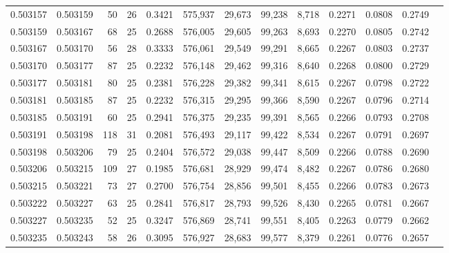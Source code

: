 \begin{tabular}{rrrrrrrrrrrrr}
0.503157 & 0.503159 &  50 &  26 &                                     0.3421 & 575,937 &  29,673 &  99,238 &   8,718 & 0.2271 & 0.0808 & 0.2749 \\
0.503159 & 0.503167 &  68 &  25 &                                     0.2688 & 576,005 &  29,605 &  99,263 &   8,693 & 0.2270 & 0.0805 & 0.2742 \\
0.503167 & 0.503170 &  56 &  28 &                                     0.3333 & 576,061 &  29,549 &  99,291 &   8,665 & 0.2267 & 0.0803 & 0.2737 \\
0.503170 & 0.503177 &  87 &  25 &                                     0.2232 & 576,148 &  29,462 &  99,316 &   8,640 & 0.2268 & 0.0800 & 0.2729 \\
0.503177 & 0.503181 &  80 &  25 &                                     0.2381 & 576,228 &  29,382 &  99,341 &   8,615 & 0.2267 & 0.0798 & 0.2722 \\
0.503181 & 0.503185 &  87 &  25 &                                     0.2232 & 576,315 &  29,295 &  99,366 &   8,590 & 0.2267 & 0.0796 & 0.2714 \\
0.503185 & 0.503191 &  60 &  25 &                                     0.2941 & 576,375 &  29,235 &  99,391 &   8,565 & 0.2266 & 0.0793 & 0.2708 \\
0.503191 & 0.503198 & 118 &  31 &                                     0.2081 & 576,493 &  29,117 &  99,422 &   8,534 & 0.2267 & 0.0791 & 0.2697 \\
0.503198 & 0.503206 &  79 &  25 &                                     0.2404 & 576,572 &  29,038 &  99,447 &   8,509 & 0.2266 & 0.0788 & 0.2690 \\
0.503206 & 0.503215 & 109 &  27 &                                     0.1985 & 576,681 &  28,929 &  99,474 &   8,482 & 0.2267 & 0.0786 & 0.2680 \\
0.503215 & 0.503221 &  73 &  27 &                                     0.2700 & 576,754 &  28,856 &  99,501 &   8,455 & 0.2266 & 0.0783 & 0.2673 \\
0.503222 & 0.503227 &  63 &  25 &                                     0.2841 & 576,817 &  28,793 &  99,526 &   8,430 & 0.2265 & 0.0781 & 0.2667 \\
0.503227 & 0.503235 &  52 &  25 &                                     0.3247 & 576,869 &  28,741 &  99,551 &   8,405 & 0.2263 & 0.0779 & 0.2662 \\
0.503235 & 0.503243 &  58 &  26 &                                     0.3095 & 576,927 &  28,683 &  99,577 &   8,379 & 0.2261 & 0.0776 & 0.2657 \\

\end{tabular}

